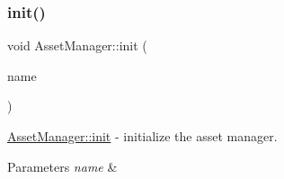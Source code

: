 \subsubsection{\texorpdfstring{init()}{init()}}
{\footnotesize\ttfamily void Asset\+Manager\+::init (\begin{DoxyParamCaption}\item[{const Q\+String \&}]{name }\end{DoxyParamCaption})\hspace{0.3cm}{\ttfamily [private]}}



\hyperlink{class_asset_manager_aa1d50ebdf4aa6df6fba090e649eb6ec0}{Asset\+Manager\+::init} -\/ initialize the asset manager. 


\begin{DoxyParams}{Parameters}
{\em name} & \\
\hline
\end{DoxyParams}

